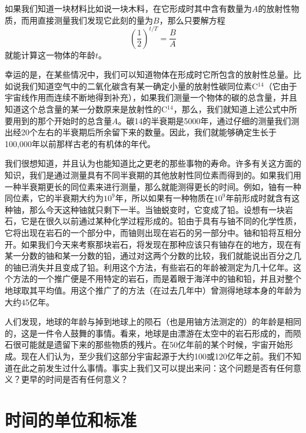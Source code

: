 如果我们知道一块材料比如说一块木料，在它形成时其中含有数量为$ A $的放射性物质，而用直接测量我们发现它此刻的量为$ B $，那么只要解方程
\begin{equation*}
(\frac{1}{2})^{t/T}=\frac{B}{A}
\end{equation*}
就能计算这一物体的年龄$ t $。

幸运的是，在某些情况中，我们可以知道物体在形成时它所包含的放射性总量。比如说我们知道空气中的二氧化碳含有某一确定小量的放射性碳同位素C$ ^{14} $（它由于宇宙线作用而连续不断地得到补充），如果我们测量一个物体的碳的总含量，并且知道这个总含量的某一分数原来是放射性的C$ ^{14} $，那么，我们就知道上述公式中所要用到的那个开始时的总含量$ A $。碳14的半衰期是5000年，通过仔细的测量我们测出经20个左右的半衰期后所余留下来的数量。因此，我们就能够确定生长于100,000年以前那样古老的有机体的年代。

我们很想知道，并且认为也能知道比之更老的那些事物的寿命。许多有关这方面的知识，我们是通过测量具有不同半衰期的其他放射性同位素而得到的。如果我们用一种半衰期更长的同位素来进行测量，那么就能测得更长的时间。例如，铀有一种同位素，它的半衰期大约为$ 10^9 $年，所以如果有一种物质在$ 10^9 $年前形成时就含有这种铀，那么今天这种铀就只剩下一半。当铀蜕变时，它变成了铅。设想有一块岩石，它是在很久以前通过某种化学过程形成的。铅由于具有与铀不同的化学性质，它将出现在岩石的一个部分中，而铀则出现在岩石的另一部分中。铀和铅将互相分开。如果我们今天来考察那块岩石，将发现在那种应该只有铀存在的地方，现在有某一分数的铀和某一分数的铅，通过对这两个分数的比较，我们就能说出百分之几的铀已消失并且变成了铅。利用这个方法，有些岩石的年龄被测定为几十亿年。这个方法的一个推广便是不用特定的岩石，而是着眼于海洋中的铀和铅，并且对整个地球取其平均值。用这个推广了的方法（在过去几年中）曾测得地球本身的年龄为大约45亿年。

人们发现，地球的年龄与掉到地球上的陨石（也是用铀方法测定的）的年龄是相同的，这是一件令人鼓舞的事情。看来，地球是由漂游在太空中的岩石形成的，而陨石很可能就是遗留下来的那些物质的残片。在50亿年前的某个时候，宇宙开始形成。现在人们认为，至少我们这部分宇宙起源于大约100或120亿年之前。我们不知道在此之前发生过什么事情。事实上我们又可以提出来问：这个问题是否有任何意义？更早的时间是否有任何意义？


\section{时间的单位和标准}

